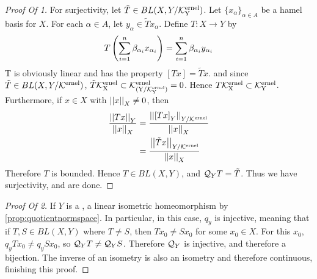 \begin{prop}
\begin{proof}[Proof Of 1]
        For surjectivity, let $\tilde{T} \in BL(X, Y/\bf\mathcal{K}\rm^{ernel}_Y)$. 
        Let $\{x_{\alpha}\}_{\alpha \in A}$ be a hamel basis for $X$. 
        For each $\alpha \in A$, let $y_{\alpha} \in \tilde{T}x_{\alpha}$. 
        Define $T:X \to Y$ by 
        \begin{equation}
            T\left( \sum_{i=1}^n \beta_{\alpha_i} x_{\alpha_i}\right) = \sum_{i=1}^n \beta_{\alpha_i} y_{\alpha_i}
        \end{equation}
        T is obviously linear
        and has the property $[Tx]=\tilde{T}x$. 
        and since $\tilde{T} \in BL(X,Y/\bf\mathcal{K}\rm^{ernel})$, 
        $\tilde{T}\bf\mathcal{K}\rm^{ernel}_X \subset \bf\mathcal{K}\rm^{ernel}_{ (Y/\bf\mathcal{K}\rm^{ernel}_Y)}=0$. 
        Hence $T \bf\mathcal{K}\rm^{ernel}_X \subset \bf\mathcal{K}\rm^{ernel}_Y$. 
        Furthermore, if $x \in X$ with $\left|\left| x \right|\right|_X \neq 0$, then
        \begin{align*}
        \frac{\left|\left| Tx \right|\right|_Y}{\left|\left| x \right|\right|_X} & = \frac{\left|\left| \left[ Tx \right]_Y \right|\right|_{Y/\bf\mathcal{K}\rm^{ernel}}}{\left|\left| x \right|\right|_X}\\
        & = \frac{\left|\left| \tilde{T}x \right|\right|_{Y/\bf\mathcal{K}\rm^{ernel}}}{\left|\left| x \right|\right|_X}
        \end{align*}
        Therefore $T$ is bounded.
        Hence $T \in BL(X,Y)$, and $\mathcal{Q}_YT=\tilde{T}$. 
        Thus we have surjectivity, and are done.
    \end{proof}
    \begin{proof}[Proof Of 2]
        If $Y$ is a \NormedSpace, 
        a linear isometric homeomorphism by 
        \ref{prop:quotientnormspace}. 
        In particular, in this case, 
        $q_y$ is injective, meaning that 
        if $T,S \in BL(X,Y)$ where
        $T \neq S$, then 
        $Tx_0 \neq Sx_0$ for some $x_0 \in X$. 
        For this $x_0$, $q_yTx_0 \neq q_ySx_0$, so 
        $\mathcal{Q}_YT \neq \mathcal{Q}_YS$. 
        Therefore $\mathcal{Q}_Y$ is injective, and therefore a bijection. 
        The inverse of an isometry is also an isometry 
        and therefore continuous, finishing this proof. 
    \end{proof}
\end{prop}
